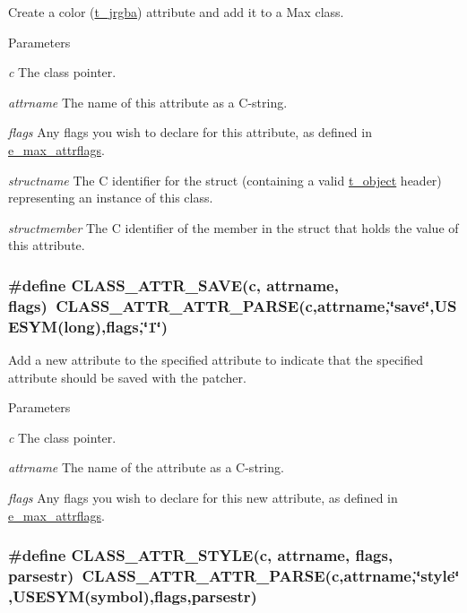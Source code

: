 Create a color (\hyperlink{structt__jrgba}{t\_\-jrgba}) attribute and add it to a Max class. 
\begin{DoxyParams}{Parameters}
\item[{\em c}]The class pointer. \item[{\em attrname}]The name of this attribute as a C-\/string. \item[{\em flags}]Any flags you wish to declare for this attribute, as defined in \hyperlink{group__attr_gaf296cfc6741bb19207f6ed8062809115}{e\_\-max\_\-attrflags}. \item[{\em structname}]The C identifier for the struct (containing a valid \hyperlink{structt__object}{t\_\-object} header) representing an instance of this class. \item[{\em structmember}]The C identifier of the member in the struct that holds the value of this attribute. \end{DoxyParams}
\hypertarget{group__attr_gaf56dc31d0defad3cdc1ee60b611acc79}{
\subsubsection[{CLASS\_\-ATTR\_\-SAVE}]{\setlength{\rightskip}{0pt plus 5cm}\#define CLASS\_\-ATTR\_\-SAVE(c, \/  attrname, \/  flags)~CLASS\_\-ATTR\_\-ATTR\_\-PARSE(c,attrname,\char`\"{}save\char`\"{},USESYM(long),flags,\char`\"{}1\char`\"{})}}
\label{group__attr_gaf56dc31d0defad3cdc1ee60b611acc79}


Add a new attribute to the specified attribute to indicate that the specified attribute should be saved with the patcher. 
\begin{DoxyParams}{Parameters}
\item[{\em c}]The class pointer. \item[{\em attrname}]The name of the attribute as a C-\/string. \item[{\em flags}]Any flags you wish to declare for this new attribute, as defined in \hyperlink{group__attr_gaf296cfc6741bb19207f6ed8062809115}{e\_\-max\_\-attrflags}. \end{DoxyParams}
\hypertarget{group__attr_ga16521ec1560a294041e78dacf6f8e4ee}{
\subsubsection[{CLASS\_\-ATTR\_\-STYLE}]{\setlength{\rightskip}{0pt plus 5cm}\#define CLASS\_\-ATTR\_\-STYLE(c, \/  attrname, \/  flags, \/  parsestr)~CLASS\_\-ATTR\_\-ATTR\_\-PARSE(c,attrname,\char`\"{}style\char`\"{},USESYM(symbol),flags,parsestr)}}
\label{group__attr_ga16521ec1560a294041e78dacf6f8e4ee}


